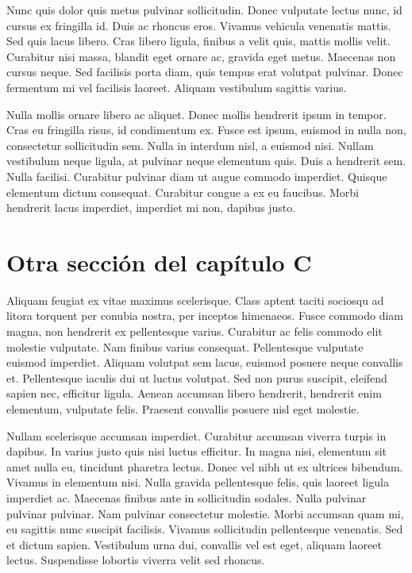 Nunc quis dolor quis metus pulvinar sollicitudin. Donec vulputate lectus nunc, id cursus ex fringilla id. Duis ac rhoncus eros. Vivamus vehicula venenatis mattis. Sed quis lacus libero. Cras libero ligula, finibus a velit quis, mattis mollis velit. Curabitur nisi massa, blandit eget ornare ac, gravida eget metus. Maecenas non cursus neque. Sed facilisis porta diam, quis tempus erat volutpat pulvinar. Donec fermentum mi vel facilisis laoreet. Aliquam vestibulum sagittis varius.

Nulla mollis ornare libero ac aliquet. Donec mollis hendrerit ipsum in tempor. Cras eu fringilla risus, id condimentum ex. Fusce est ipsum, euismod in nulla non, consectetur sollicitudin sem. Nulla in interdum nisl, a euismod nisi. Nullam vestibulum neque ligula, at pulvinar neque elementum quis. Duis a hendrerit sem. Nulla facilisi. Curabitur pulvinar diam ut augue commodo imperdiet. Quisque elementum dictum consequat. Curabitur congue a ex eu faucibus. Morbi hendrerit lacus imperdiet, imperdiet mi non, dapibus justo.
		
\section{Otra secci\'on del cap\'itulo C}

Aliquam feugiat ex vitae maximus scelerisque. Class aptent taciti sociosqu ad litora torquent per conubia nostra, per inceptos himenaeos. Fusce commodo diam magna, non hendrerit ex pellentesque varius. Curabitur ac felis commodo elit molestie vulputate. Nam finibus varius consequat. Pellentesque vulputate euismod imperdiet. Aliquam volutpat sem lacus, euismod posuere neque convallis et. Pellentesque iaculis dui ut luctus volutpat. Sed non purus suscipit, eleifend sapien nec, efficitur ligula. Aenean accumsan libero hendrerit, hendrerit enim elementum, vulputate felis. Praesent convallis posuere nisl eget molestie.

Nullam scelerisque accumsan imperdiet. Curabitur accumsan viverra turpis in dapibus. In varius justo quis nisi luctus efficitur. In magna nisi, elementum sit amet nulla eu, tincidunt pharetra lectus. Donec vel nibh ut ex ultrices bibendum. Vivamus in elementum nisi. Nulla gravida pellentesque felis, quis laoreet ligula imperdiet ac. Maecenas finibus ante in sollicitudin sodales. Nulla pulvinar pulvinar pulvinar. Nam pulvinar consectetur molestie. Morbi accumsan quam mi, eu sagittis nunc suscipit facilisis. Vivamus sollicitudin pellentesque venenatis. Sed et dictum sapien. Vestibulum urna dui, convallis vel est eget, aliquam laoreet lectus. Suspendisse lobortis viverra velit sed rhoncus.

